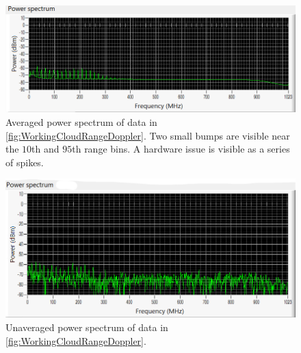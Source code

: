 \documentclass{article}
\begin{document}
\begin{figure}[h]
	\centering
	\includegraphics[width=\textwidth]{working-cloud_power-spect}
	\caption{Averaged power spectrum of data in \ref{fig:WorkingCloudRangeDoppler}. Two small bumps are visible near the \(10\)th and \(95\)th range bins. A hardware issue is visible as a series of spikes.}
	\label{fig:WorkingCloudPowerSpectrum}
\end{figure}

\begin{figure}[h]
	\centering
	\includegraphics[width=\textwidth]{working-cloud_power-spect-unavg}
	\caption{Unaveraged power spectrum of data in \ref{fig:WorkingCloudRangeDoppler}.}
	\label{fig:WorkingCloudPowerSpectrumUnaveraged}
\end{figure}
\end{document}
